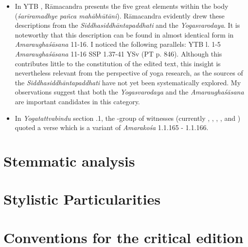 \begin{itemize}
\item In YTB , Rāmacandra presents the five great elements within the body (\textit{śarīramadhye pañca mahābhūtāni}). Rāmacandra evidently drew these descriptions from the \emph{Siddhasiddhāntapaddhati} and the \emph{Yogasvarodaya}. It is noteworthy that this description can be found in almost identical form in \emph{Amaraughaśāsana} 11-16. I noticed the following parallels: YTB  l. 1-5 \approx \emph{Amaraughaśāsana} 11-16 \approx SSP 1.37-41 \approx YSv (PT p. 846). Although this contributes little to the constitution of the edited text, this insight is nevertheless relevant from the perspective of yoga research, as the sources of the \emph{Siddhasiddhāntapaddhati} have not yet been systematically explored. My observations suggest that both the \emph{Yogasvarodaya} and the \emph{Amaraughaśāsana} are important candidates in this category.

\item In \emph{Yogatattvabindu} section .1, the \beta-group of witnesses (currently , , , , and ) quoted a verse which is a variant of \emph{Amarakośa} 1.1.165 - 1.1.166.
  
\end{itemize}

\section{Stemmatic analysis}
\label{stemma}


\section{Stylistic Particularities}

\section{Conventions for the critical edition}


